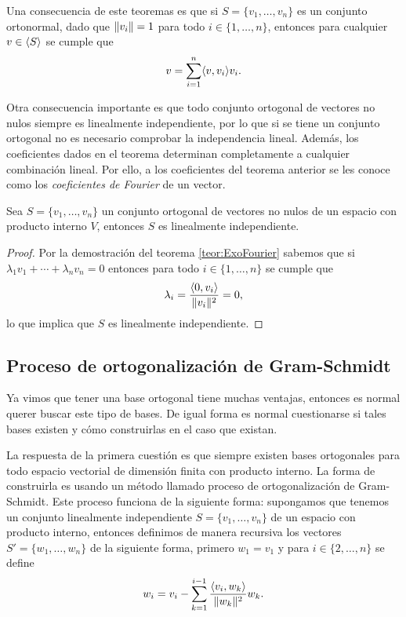 Una consecuencia de este teoremas es que si $S = \{v_1, \ldots, v_n\}$ es un conjunto ortonormal, dado que $\mathopen\|v_i\mathclose\| = 1$ para todo $i\in\{1,\ldots,n\}$, entonces para cualquier $v\in \langle S\rangle$ se cumple que 
\[
  v = \sum_{i=1}^n \langle v,v_i\rangle v_i.
\]

Otra consecuencia importante es que todo conjunto ortogonal de vectores no nulos siempre es linealmente independiente, por lo que si se tiene un conjunto ortogonal no es necesario comprobar la independencia lineal. Además, los coeficientes dados en el teorema determinan completamente a cualquier combinación lineal. Por ello, a los coeficientes del teorema anterior se les conoce como los \emph{coeficientes de Fourier} de un vector.

\begin{coro} \label{coro:IndepOrtog}
  Sea $S = \{v_1, \ldots, v_n\}$ un conjunto ortogonal de vectores no nulos de un espacio con producto interno $V$, entonces $S$ es linealmente independiente.
\end{coro}
\begin{proof}
  Por la demostración del teorema \ref{teor:ExoFourier} sabemos que si $\lambda_1 v_1 + \cdots + \lambda_n v_n = 0$ entonces para todo $i \in  \{1,\ldots,n\}$ se cumple que
    \[
      \lambda_i = \frac{\langle0,v_i\rangle}{\mathopen\|v_i\mathclose\|^2} = 0,
    \]
  lo que implica que $S$ es linealmente independiente.
\end{proof}



\subsection{Proceso de ortogonalización de Gram-Schmidt}

Ya vimos que tener una base ortogonal tiene muchas ventajas, entonces es normal querer buscar este tipo de bases. De igual forma es normal cuestionarse si tales bases existen y cómo construirlas en el caso que existan.

La respuesta de la primera cuestión es que siempre existen bases ortogonales para todo espacio vectorial de dimensión finita con producto interno. La forma de construirla es usando un método llamado proceso de ortogonalización de Gram-Schmidt. Este proceso funciona de la siguiente forma: supongamos que tenemos un conjunto linealmente independiente $S = \{v_1,\ldots,v_n\}$ de un espacio con producto interno, entonces definimos de manera recursiva los vectores $S' = \{w_1,\ldots,w_n\}$ de la siguiente forma, primero $w_1 = v_1$ y para $i \in \{2,\ldots,n\}$ se define
  \[
    w_i = v_i - \sum_{k=1}^{i-1} \frac{\langle v_i,w_k\rangle}{\mathopen\|w_k\mathclose\|^2} w_k.
  \]

